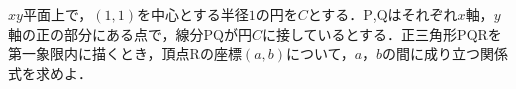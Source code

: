 $xy$平面上で，$(1,1)$を中心とする半径$1$の円を$C$とする．$\mathrm{P}$,$\mathrm{Q}$はそれぞれ$x$軸，$y$軸の正の部分にある点で，線分$\mathrm{PQ}$が円$C$に接しているとする．正三角形$\mathrm{PQR}$を第一象限内に描くとき，頂点$\mathrm{R}$の座標$(a,b)$について，$a$，$b$の間に成り立つ関係式を求めよ．

